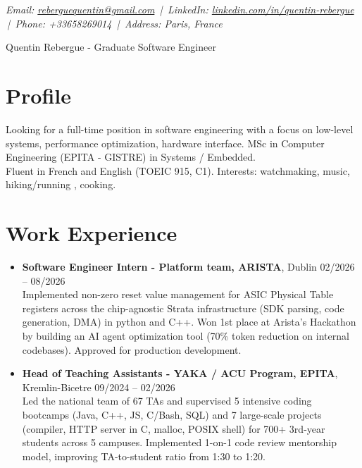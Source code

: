 \documentclass[9pt,a4paper]{article}
\newcommand{\namefont}{\fontsize{20}{22}\selectfont}
\newcommand{\tinyscript}{\fontsize{8}{9}\selectfont}
\begin{document}
\renewcommand\normalsize{\fontsize{10.5}{15}\selectfont}
\normalsize

\begin{center}
  {\tinyscript\itshape
  Email: \href{mailto:reberguequentin@gmail.com}{reberguequentin@gmail.com} \,|\,
  LinkedIn: \href{https://linkedin.com/in/quentin-rebergue}{linkedin.com/in/quentin-rebergue} \,|\,
  Phone: +33658269014 \,|\,
  Address: Paris, France}
\end{center}

\begin{center}
  {\namefont Quentin Rebergue - Graduate Software Engineer}
\end{center}

\section*{Profile}
\begin{tcolorbox}[mybox2]
Looking for a full-time position in software engineering with a focus on low-level systems, performance optimization, hardware interface. MSc in Computer Engineering (EPITA - GISTRE) in Systems / Embedded.\\[0.3em]
Fluent in French and English (TOEIC 915, C1). Interests: watchmaking, music, hiking/running , cooking.
\end{tcolorbox}

\section*{Work Experience}
\begin{tcolorbox}[mybox]
\begin{itemize}
\item\textbf{Software Engineer Intern - Platform team, ARISTA}, Dublin \hfill {\small02/2026 – 08/2026}\\[0.5em]
\textcolor{gray!40!black}{Implemented non-zero reset value management for ASIC Physical Table registers across the chip-agnostic Strata infrastructure (SDK parsing, code generation, DMA) in python and C++.
Won 1st place at Arista's Hackathon by building an AI agent optimization tool (70\% token reduction on internal codebases). Approved for production development.}

\item\textbf{Head of Teaching Assistants - YAKA / ACU Program, EPITA}, Kremlin-Bicetre \hfill {\small09/2024 – 02/2026}\\[0.5em]
\textcolor{gray!40!black}{Led the national team of 67 TAs and supervised 5 intensive coding bootcamps (Java, C++, JS, C/Bash, SQL) and 7 large-scale projects (compiler, HTTP server in C, malloc, POSIX shell) for 700+ 3rd-year students across 5 campuses. Implemented 1-on-1 code review mentorship model, improving TA-to-student ratio from 1:30 to 1:20.}
\end{itemize}
\end{tcolorbox}
\end{document}

